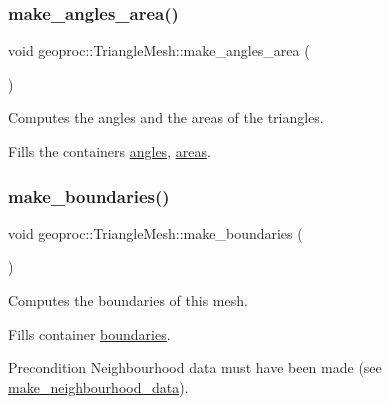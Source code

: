 \subsubsection{\texorpdfstring{make\+\_\+angles\+\_\+area()}{make\_angles\_area()}}
{\footnotesize\ttfamily void geoproc\+::\+Triangle\+Mesh\+::make\+\_\+angles\+\_\+area (\begin{DoxyParamCaption}{ }\end{DoxyParamCaption})}



Computes the angles and the areas of the triangles. 

Fills the containers \hyperlink{classgeoproc_1_1TriangleMesh_a50b5456f546551aa39d68487614d7720}{angles}, \hyperlink{classgeoproc_1_1TriangleMesh_a134859a7251c2ae7c8b64b2e44e8ad0e}{areas}. \mbox{\label{classgeoproc_1_1TriangleMesh_ad11c9406e2677e4d72d53837206fd769}} 
\subsubsection{\texorpdfstring{make\+\_\+boundaries()}{make\_boundaries()}}
{\footnotesize\ttfamily void geoproc\+::\+Triangle\+Mesh\+::make\+\_\+boundaries (\begin{DoxyParamCaption}{ }\end{DoxyParamCaption})}



Computes the boundaries of this mesh. 

Fills container \hyperlink{classgeoproc_1_1TriangleMesh_a57162eac37831c87786a8dab8331d72f}{boundaries}. \begin{DoxyPrecond}{Precondition}
Neighbourhood data must have been made (see \hyperlink{classgeoproc_1_1TriangleMesh_a84003dfdfd5e591c00f01a797578ff1f}{make\+\_\+neighbourhood\+\_\+data}). 
\end{DoxyPrecond}
\mbox{\label{classgeoproc_1_1TriangleMesh_a84003dfdfd5e591c00f01a797578ff1f}} 
